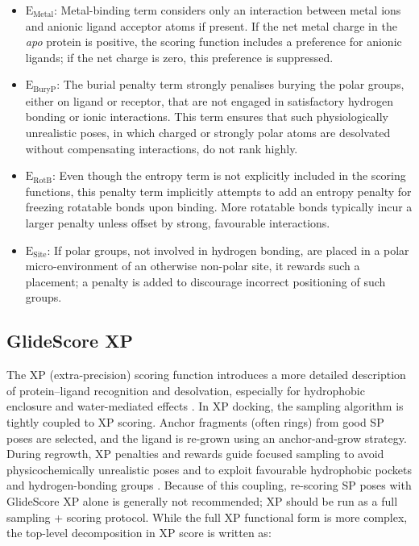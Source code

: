 \documentclass[12pt]{article}
\begin{document}
\begin{itemize}
  \item $\textrm{E}_{\textrm{Metal}}$: Metal-binding term considers only an interaction between metal ions and anionic ligand acceptor atoms if present. If the net metal charge in the \emph{apo} protein is positive, the scoring function includes a preference for anionic ligands; if the net charge is zero, this preference is suppressed.

  \item $\textrm{E}_{\textrm{BuryP}}$: The burial penalty term strongly penalises burying the polar groups, either on ligand or receptor, that are not engaged in satisfactory hydrogen bonding or ionic interactions. This term ensures that such physiologically unrealistic poses, in which charged or strongly polar atoms are desolvated without compensating interactions, do not rank highly. 

  \item $\textrm{E}_{\textrm{RotB}}$: Even though the entropy term is not explicitly included in the scoring functions, this penalty term implicitly attempts to add an entropy penalty for freezing rotatable bonds upon binding.  More rotatable bonds typically incur a larger penalty unless offset by strong, favourable interactions. 

  \item $\textrm{E}_{\textrm{Site}}$: If polar groups, not involved in hydrogen bonding, are placed in a polar micro-environment of an otherwise non-polar site, it rewards such a placement; a penalty is added to discourage incorrect positioning of such groups. 

\end{itemize}


\subsection{GlideScore XP}

The XP (extra-precision) scoring function introduces a more detailed description of protein–ligand recognition and desolvation, especially for hydrophobic enclosure and water-mediated effects \cite{CH7_Friesner2006}. In XP docking, the sampling algorithm is tightly coupled to XP scoring. Anchor fragments (often rings) from good SP poses are selected, and the ligand is re-grown using an anchor-and-grow strategy. During regrowth, XP penalties and rewards guide focused sampling to avoid physicochemically unrealistic poses and to exploit favourable hydrophobic pockets and hydrogen-bonding groups \cite{CH7_Friesner2006}. Because of this coupling, re-scoring SP poses with GlideScore XP alone is generally not recommended; XP should be run as a full sampling + scoring protocol. While the full XP functional form is more complex, the top-level decomposition in XP score is written as\cite{CH7_Friesner2006}:
\end{document}
